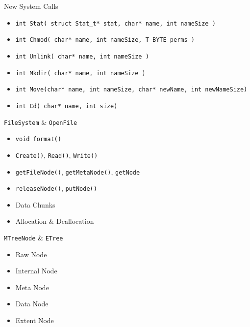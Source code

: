 \documentclass[landscape]{slides}
\newcommand{\code}[1]{\texttt{#1}}
\begin{document}
    \begin{slide}
	\begin{center}\large New System Calls\end{center}
	\begin{itemize}\small
	  \item \code{int Stat( struct Stat\_t* stat, char* name, int nameSize )}
	  \item \code{int Chmod( char* name, int nameSize, T\_BYTE perms )}
	  \item \code{int Unlink( char* name, int nameSize )}
	  \item \code{int Mkdir( char* name, int nameSize )}
	  \item \code{int Move(char* name, int nameSize, char* newName, int newNameSize)}
	  \item \code{int Cd( char* name, int size)}
	\end{itemize}
    \end{slide}

    \begin{slide}
	\begin{center}\large \code{FileSystem} \& \code{OpenFile}\end{center}
	\begin{itemize}
	  \item \code{void format()}
	  \item \code{Create()}, \code{Read()}, \code{Write()}
	  \item \code{getFileNode()}, \code{getMetaNode()}, \code{getNode}
	  \item \code{releaseNode()}, \code{putNode()}
	  \item Data Chunks
	  \item Allocation \& Deallocation
	\end{itemize}
    \end{slide}

    \begin{slide}
	\begin{center}\large \code{MTreeNode} \& \code{ETree}\end{center}
	\begin{itemize}
	    \item Raw Node
	    \item Internal Node
	    \item Meta Node
	    \item Data Node
	    \item Extent Node
	\end{itemize}
    \end{slide}
\end{document}
